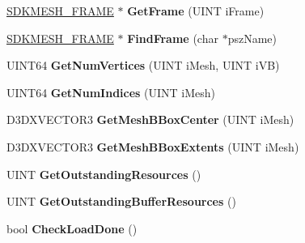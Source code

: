 \begin{DoxyCompactItemize}
\item 
\hypertarget{class_c_d_x_u_t_s_d_k_mesh_a5faff11a7f7de4873d08fe87bd443cc0}{\hyperlink{struct_s_d_k_m_e_s_h___f_r_a_m_e}{S\+D\+K\+M\+E\+S\+H\+\_\+\+F\+R\+A\+M\+E} $\ast$ {\bfseries Get\+Frame} (U\+I\+N\+T i\+Frame)}\label{class_c_d_x_u_t_s_d_k_mesh_a5faff11a7f7de4873d08fe87bd443cc0}

\item 
\hypertarget{class_c_d_x_u_t_s_d_k_mesh_a463aff8d46d724ac4131887cf2289237}{\hyperlink{struct_s_d_k_m_e_s_h___f_r_a_m_e}{S\+D\+K\+M\+E\+S\+H\+\_\+\+F\+R\+A\+M\+E} $\ast$ {\bfseries Find\+Frame} (char $\ast$psz\+Name)}\label{class_c_d_x_u_t_s_d_k_mesh_a463aff8d46d724ac4131887cf2289237}

\item 
\hypertarget{class_c_d_x_u_t_s_d_k_mesh_aa248501723e8037989897529e40629f4}{U\+I\+N\+T64 {\bfseries Get\+Num\+Vertices} (U\+I\+N\+T i\+Mesh, U\+I\+N\+T i\+V\+B)}\label{class_c_d_x_u_t_s_d_k_mesh_aa248501723e8037989897529e40629f4}

\item 
\hypertarget{class_c_d_x_u_t_s_d_k_mesh_a4196d35f3c0fd5c73c564d2adfcbdb6c}{U\+I\+N\+T64 {\bfseries Get\+Num\+Indices} (U\+I\+N\+T i\+Mesh)}\label{class_c_d_x_u_t_s_d_k_mesh_a4196d35f3c0fd5c73c564d2adfcbdb6c}

\item 
\hypertarget{class_c_d_x_u_t_s_d_k_mesh_a94477e7fe365241be627462fd694f676}{D3\+D\+X\+V\+E\+C\+T\+O\+R3 {\bfseries Get\+Mesh\+B\+Box\+Center} (U\+I\+N\+T i\+Mesh)}\label{class_c_d_x_u_t_s_d_k_mesh_a94477e7fe365241be627462fd694f676}

\item 
\hypertarget{class_c_d_x_u_t_s_d_k_mesh_a941b1860725dcfcd464abd80ba2eb293}{D3\+D\+X\+V\+E\+C\+T\+O\+R3 {\bfseries Get\+Mesh\+B\+Box\+Extents} (U\+I\+N\+T i\+Mesh)}\label{class_c_d_x_u_t_s_d_k_mesh_a941b1860725dcfcd464abd80ba2eb293}

\item 
\hypertarget{class_c_d_x_u_t_s_d_k_mesh_abdc5943a16884df409c2f8c37d4e56a3}{U\+I\+N\+T {\bfseries Get\+Outstanding\+Resources} ()}\label{class_c_d_x_u_t_s_d_k_mesh_abdc5943a16884df409c2f8c37d4e56a3}

\item 
\hypertarget{class_c_d_x_u_t_s_d_k_mesh_ad4d7b8e882c12fd9e8d0fc01523abed0}{U\+I\+N\+T {\bfseries Get\+Outstanding\+Buffer\+Resources} ()}\label{class_c_d_x_u_t_s_d_k_mesh_ad4d7b8e882c12fd9e8d0fc01523abed0}

\item 
\hypertarget{class_c_d_x_u_t_s_d_k_mesh_a4b5082a55d6944520a6da8f6d8717a22}{bool {\bfseries Check\+Load\+Done} ()}\label{class_c_d_x_u_t_s_d_k_mesh_a4b5082a55d6944520a6da8f6d8717a22}


\end{DoxyCompactItemize}
